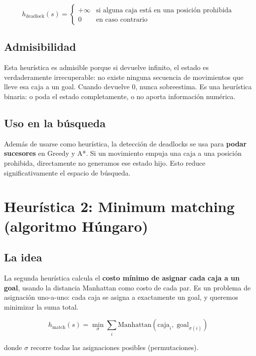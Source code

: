 \documentclass[12pt, a4paper]{article}
\begin{document}
$$
h_{\text{deadlock}}(s) = \begin{cases} +\infty & \text{si alguna caja está en una posición prohibida} \\ 0 & \text{en caso contrario} \end{cases}
$$

\subsection{Admisibilidad}

Esta heurística es admisible porque si devuelve infinito, el estado es verdaderamente irrecuperable: no existe ninguna secuencia de movimientos que lleve esa caja a un goal. Cuando devuelve 0, nunca sobreestima. Es una heurística binaria: o poda el estado completamente, o no aporta información numérica.

\subsection{Uso en la búsqueda}

Además de usarse como heurística, la detección de deadlocks se usa para \textbf{podar sucesores} en Greedy y A*. Si un movimiento empuja una caja a una posición prohibida, directamente no generamos ese estado hijo. Esto reduce significativamente el espacio de búsqueda.

\section{Heurística 2: Minimum matching (algoritmo Húngaro)}

\subsection{La idea}

La segunda heurística calcula el \textbf{costo mínimo de asignar cada caja a un goal}, usando la distancia Manhattan como costo de cada par. Es un problema de asignación uno-a-uno: cada caja se asigna a exactamente un goal, y queremos minimizar la suma total.

$$h_{\text{match}}(s) = \min_{\sigma} \sum_{i} \text{Manhattan}(\text{caja}_i,\; \text{goal}_{\sigma(i)})$$

donde $\sigma$ recorre todas las asignaciones posibles (permutaciones).
\end{document}
